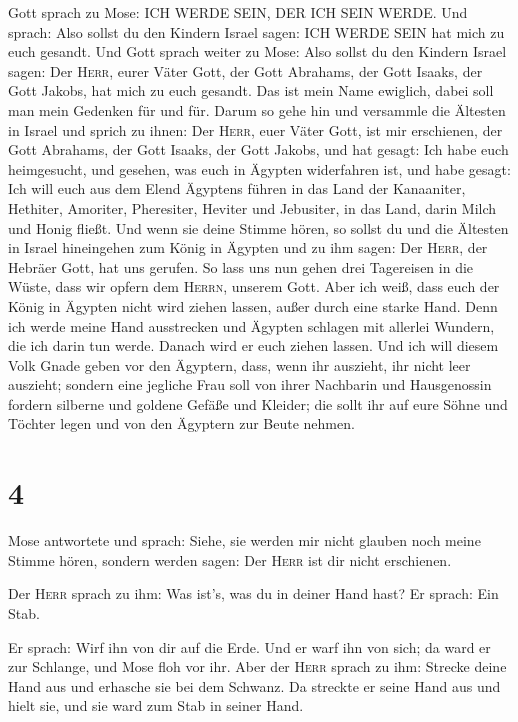  Gott sprach zu Mose: ICH WERDE SEIN, DER ICH SEIN WERDE.
Und sprach: Also sollst du den Kindern Israel sagen: ICH WERDE SEIN hat
mich zu euch gesandt.  Und Gott sprach weiter zu Mose:
Also sollst du den Kindern Israel sagen: Der \textsc{Herr}, eurer Väter
Gott, der Gott Abrahams, der Gott Isaaks, der Gott Jakobs, hat mich zu
euch gesandt. Das ist mein Name ewiglich, dabei soll man mein Gedenken
für und für.  Darum so gehe hin und versammle die
Ältesten in Israel und sprich zu ihnen: Der \textsc{Herr}, euer Väter
Gott, ist mir erschienen, der Gott Abrahams, der Gott Isaaks, der Gott
Jakobs, und hat gesagt: Ich habe euch heimgesucht, und gesehen, was euch
in Ägypten widerfahren ist,  und habe gesagt: Ich will
euch aus dem Elend Ägyptens führen in das Land der Kanaaniter, Hethiter,
Amoriter, Pheresiter, Heviter und Jebusiter, in das Land, darin Milch
und Honig fließt.  Und wenn sie deine Stimme hören, so
sollst du und die Ältesten in Israel hineingehen zum König in Ägypten
und zu ihm sagen: Der \textsc{Herr}, der Hebräer Gott, hat uns gerufen.
So lass uns nun gehen drei Tagereisen in die Wüste, dass wir opfern dem
\textsc{Herrn}, unserem Gott.  Aber ich weiß, dass euch
der König in Ägypten nicht wird ziehen lassen, außer durch eine starke
Hand.  Denn ich werde meine Hand ausstrecken und Ägypten
schlagen mit allerlei Wundern, die ich darin tun werde. Danach wird er
euch ziehen lassen.  Und ich will diesem Volk Gnade geben
vor den Ägyptern, dass, wenn ihr auszieht, ihr nicht leer auszieht;
 sondern eine jegliche Frau soll von ihrer Nachbarin und
Hausgenossin fordern silberne und goldene Gefäße und Kleider; die sollt
ihr auf eure Söhne und Töchter legen und von den Ägyptern zur Beute
nehmen.

\hypertarget{section-3}{%
\section{4}\label{section-3}}

 Mose antwortete und sprach: Siehe, sie werden mir nicht
glauben noch meine Stimme hören, sondern werden sagen: Der \textsc{Herr}
ist dir nicht erschienen.

 Der \textsc{Herr} sprach zu ihm: Was ist's, was du in
deiner Hand hast? Er sprach: Ein Stab.

 Er sprach: Wirf ihn von dir auf die Erde. Und er warf ihn
von sich; da ward er zur Schlange, und Mose floh vor ihr. 
Aber der \textsc{Herr} sprach zu ihm: Strecke deine Hand aus und
erhasche sie bei dem Schwanz. Da streckte er seine Hand aus und hielt
sie, und sie ward zum Stab in seiner Hand.

